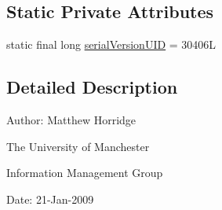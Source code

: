 \subsection*{Static Private Attributes}
\begin{DoxyCompactItemize}
\item 
static final long \hyperlink{classorg_1_1semanticweb_1_1owlapi_1_1reasoner_1_1_o_w_l_reasoner_runtime_exception_a8a3b257a26610a82002a81b7e238e1ef}{serial\-Version\-U\-I\-D} = 30406\-L
\end{DoxyCompactItemize}


\subsection{Detailed Description}
Author\-: Matthew Horridge\par
 The University of Manchester\par
 Information Management Group\par
 Date\-: 21-\/\-Jan-\/2009 

